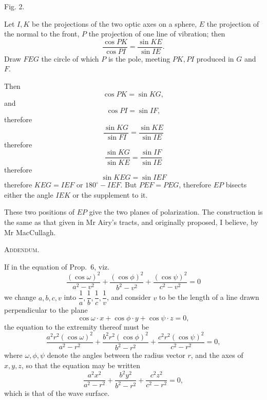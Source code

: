 \documentclass[11pt]{article}
\newcommand{\sourcepage}[1]{\marginpar{\scriptsize p.~#1}}
\begin{document}
\begin{center}
\par
{\small Fig. 2.}
\end{center}

Let $I,K$ be the projections of the two optic axes on a sphere, $E$ the projection of the normal to the front, $P$ the projection of one line of vibration; then
\[
 \frac{\cos PK}{\cos PI}=\frac{\sin KE}{\sin IE}.
\]
Draw $FEG$ the circle of which $P$ is the pole, meeting $PK,PI$ produced in $G$ and $F$.

Then
\[
 \cos PK=\sin KG,
\]
and
\[
 \cos PI=\sin IF,
\]
therefore
\[
 \frac{\sin KG}{\sin FI}=\frac{\sin KE}{\sin IE}
\]
therefore
\[
 \frac{\sin KG}{\sin KE}=\frac{\sin IF}{\sin IE}
\]
therefore
\[
 \sin KEG=\sin IEF
\]
therefore $KEG=IEF$ or $180^\circ-IEF$. But $PEF=PEG$, therefore $EP$ bisects either the angle $IEK$ or the supplement to it.

These two positions of $EP$ give the two planes of polarization. The construction is the same as that given in Mr Airy's tracts, and originally proposed, I believe, by Mr MacCullagh.

\sourcepage{14}
\begin{center}{\large\scshape Addendum.}\end{center}

If in the equation of Prop.~6, viz.
\[
 \frac{(\cos\omega)^2}{a^2-v^2}+\frac{(\cos\phi)^2}{b^2-v^2}+\frac{(\cos\psi)^2}{c^2-v^2}=0
\]
we change $a,b,c,v$ into $\dfrac1a,\dfrac1b,\dfrac1c,\dfrac1v$, and consider $v$ to be the length of a line drawn perpendicular to the plane
\[
 \cos\omega\cdot x+\cos\phi\cdot y+\cos\psi\cdot z=0,
\]
the equation to the extremity thereof must be
\[
 \frac{a^2r^2(\cos\omega)^2}{a^2-r^2}
 +\frac{b^2r^2(\cos\phi)^2}{b^2-r^2}
 +\frac{c^2r^2(\cos\psi)^2}{c^2-r^2}=0,
\]
where $\omega,\phi,\psi$ denote the angles between the radius vector $r$, and the axes of $x,y,z$, so that the equation may be written
\[
 \frac{a^2x^2}{a^2-r^2}+\frac{b^2y^2}{b^2-r^2}+\frac{c^2z^2}{c^2-r^2}=0,
\]
which is that of the wave surface.
\end{document}

